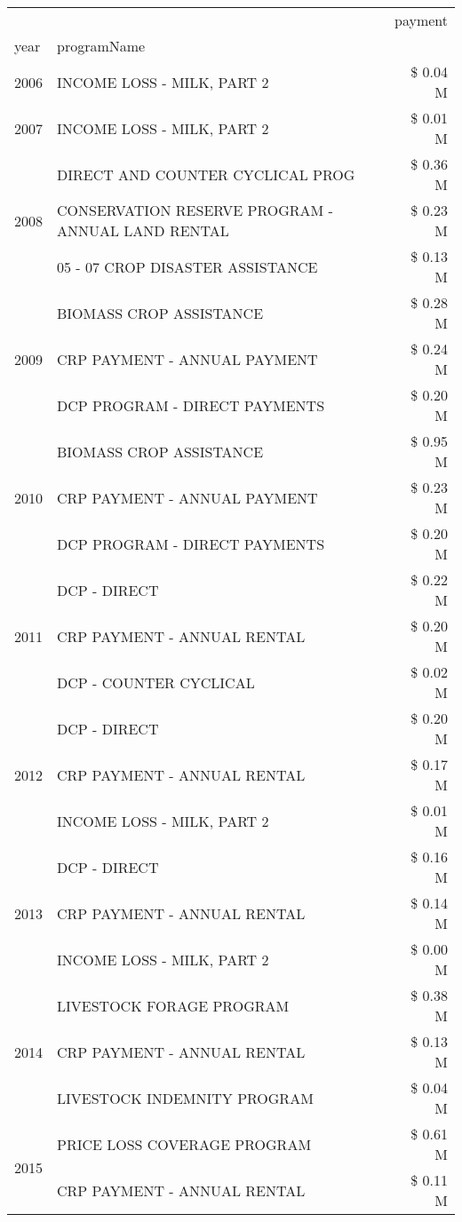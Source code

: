 \begin{tabular}{llr}
\toprule
 &  & payment \\
year & programName &  \\
\midrule
2006 & INCOME LOSS - MILK, PART 2 & \$ 0.04 M \\
\cline{1-3}
2007 & INCOME LOSS - MILK, PART 2 & \$ 0.01 M \\
\cline{1-3}
\multirow[t]{3}{*}{2008} & DIRECT AND COUNTER CYCLICAL PROG & \$ 0.36 M \\
 & CONSERVATION RESERVE PROGRAM - ANNUAL LAND RENTAL & \$ 0.23 M \\
 & 05 - 07 CROP DISASTER ASSISTANCE & \$ 0.13 M \\
\cline{1-3}
\multirow[t]{3}{*}{2009} & BIOMASS CROP ASSISTANCE & \$ 0.28 M \\
 & CRP PAYMENT - ANNUAL PAYMENT & \$ 0.24 M \\
 & DCP PROGRAM - DIRECT PAYMENTS & \$ 0.20 M \\
\cline{1-3}
\multirow[t]{3}{*}{2010} & BIOMASS CROP ASSISTANCE & \$ 0.95 M \\
 & CRP PAYMENT - ANNUAL PAYMENT & \$ 0.23 M \\
 & DCP PROGRAM - DIRECT PAYMENTS & \$ 0.20 M \\
\cline{1-3}
\multirow[t]{3}{*}{2011} & DCP - DIRECT & \$ 0.22 M \\
 & CRP PAYMENT - ANNUAL RENTAL & \$ 0.20 M \\
 & DCP - COUNTER CYCLICAL & \$ 0.02 M \\
\cline{1-3}
\multirow[t]{3}{*}{2012} & DCP - DIRECT & \$ 0.20 M \\
 & CRP PAYMENT - ANNUAL RENTAL & \$ 0.17 M \\
 & INCOME LOSS - MILK, PART 2 & \$ 0.01 M \\
\cline{1-3}
\multirow[t]{3}{*}{2013} & DCP - DIRECT & \$ 0.16 M \\
 & CRP PAYMENT - ANNUAL RENTAL & \$ 0.14 M \\
 & INCOME LOSS - MILK, PART 2 & \$ 0.00 M \\
\cline{1-3}
\multirow[t]{3}{*}{2014} & LIVESTOCK FORAGE PROGRAM & \$ 0.38 M \\
 & CRP PAYMENT - ANNUAL RENTAL & \$ 0.13 M \\
 & LIVESTOCK INDEMNITY PROGRAM & \$ 0.04 M \\
\cline{1-3}
\multirow[t]{3}{*}{2015} & PRICE LOSS COVERAGE PROGRAM & \$ 0.61 M \\
 & CRP PAYMENT - ANNUAL RENTAL & \$ 0.11 M \\

\end{tabular}
